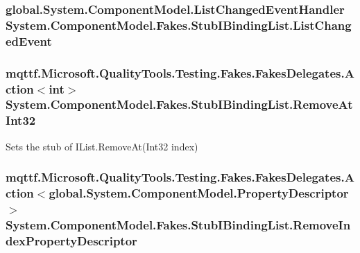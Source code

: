 \hypertarget{class_system_1_1_component_model_1_1_fakes_1_1_stub_i_binding_list_afbd059ed51f1da52f61dad7d2fb424a6}{
\subsubsection[{List\-Changed\-Event}]{\setlength{\rightskip}{0pt plus 5cm}global.\-System.\-Component\-Model.\-List\-Changed\-Event\-Handler System.\-Component\-Model.\-Fakes.\-Stub\-I\-Binding\-List.\-List\-Changed\-Event}}\label{class_system_1_1_component_model_1_1_fakes_1_1_stub_i_binding_list_afbd059ed51f1da52f61dad7d2fb424a6}
\hypertarget{class_system_1_1_component_model_1_1_fakes_1_1_stub_i_binding_list_a776f7e55c2d56d8658371fa724eb9ffc}{
\subsubsection[{Remove\-At\-Int32}]{\setlength{\rightskip}{0pt plus 5cm}mqttf.\-Microsoft.\-Quality\-Tools.\-Testing.\-Fakes.\-Fakes\-Delegates.\-Action$<$int$>$ System.\-Component\-Model.\-Fakes.\-Stub\-I\-Binding\-List.\-Remove\-At\-Int32}}\label{class_system_1_1_component_model_1_1_fakes_1_1_stub_i_binding_list_a776f7e55c2d56d8658371fa724eb9ffc}


Sets the stub of I\-List.\-Remove\-At(\-Int32 index)

\hypertarget{class_system_1_1_component_model_1_1_fakes_1_1_stub_i_binding_list_a785cca67b49da07729f23cf171b95717}{
\subsubsection[{Remove\-Index\-Property\-Descriptor}]{\setlength{\rightskip}{0pt plus 5cm}mqttf.\-Microsoft.\-Quality\-Tools.\-Testing.\-Fakes.\-Fakes\-Delegates.\-Action$<$global.\-System.\-Component\-Model.\-Property\-Descriptor$>$ System.\-Component\-Model.\-Fakes.\-Stub\-I\-Binding\-List.\-Remove\-Index\-Property\-Descriptor}}\label{class_system_1_1_component_model_1_1_fakes_1_1_stub_i_binding_list_a785cca67b49da07729f23cf171b95717}



